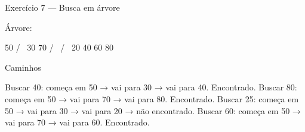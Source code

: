 Exercício 7 — Busca em árvore

Árvore:

        50
       /  \
     30    70
    / \    / \
  20  40  60  80

Caminhos

Buscar 40: começa em 50 → vai para 30 → vai para 40. Encontrado.
Buscar 80: começa em 50 → vai para 70 → vai para 80. Encontrado.
Buscar 25: começa em 50 → vai para 30 → vai para 20 → não encontrado.
Buscar 60: começa em 50 → vai para 70 → vai para 60. Encontrado.